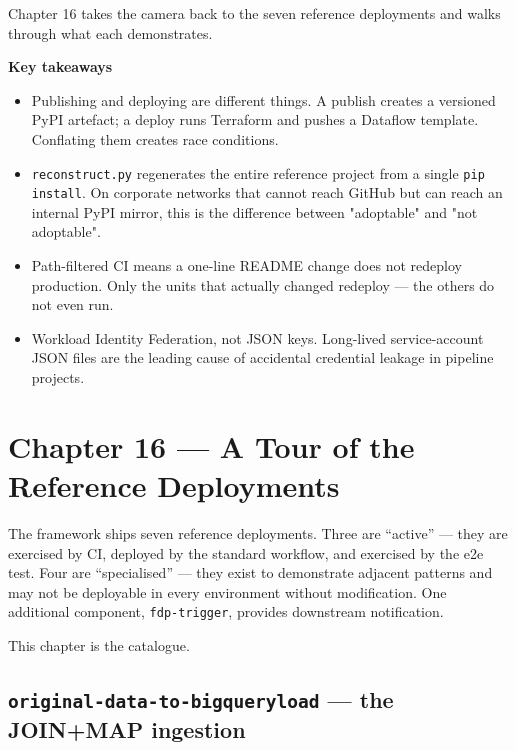 \documentclass[
  11pt,
  british,
  oneside]{book}
\begin{document}
Chapter 16 takes the camera back to the seven reference deployments and
walks through what each demonstrates.

\begin{takeaways}
\textbf{Key takeaways}
\begin{itemize}
  \item Publishing and deploying are different things. A publish creates a versioned PyPI artefact; a deploy runs Terraform and pushes a Dataflow template. Conflating them creates race conditions.
  \item \texttt{reconstruct.py} regenerates the entire reference project from a single \texttt{pip install}. On corporate networks that cannot reach GitHub but can reach an internal PyPI mirror, this is the difference between "adoptable" and "not adoptable".
  \item Path-filtered CI means a one-line README change does not redeploy production. Only the units that actually changed redeploy — the others do not even run.
  \item Workload Identity Federation, not JSON keys. Long-lived service-account JSON files are the leading cause of accidental credential leakage in pipeline projects.
\end{itemize}
\end{takeaways}

\newpage

\hypertarget{chapter-16-a-tour-of-the-reference-deployments}{%
\chapter{Chapter 16 --- A Tour of the Reference
Deployments}\label{chapter-16-a-tour-of-the-reference-deployments}}

The framework ships seven reference deployments. Three are ``active''
--- they are exercised by CI, deployed by the standard workflow, and
exercised by the e2e test. Four are ``specialised'' --- they exist to
demonstrate adjacent patterns and may not be deployable in every
environment without modification. One additional component,
\texttt{fdp-trigger}, provides downstream notification.

This chapter is the catalogue.

\hypertarget{original-data-to-bigqueryload-the-joinmap-ingestion}{%
\section{\texorpdfstring{\texttt{original-data-to-bigqueryload} --- the
JOIN+MAP
ingestion}{original-data-to-bigqueryload --- the JOIN+MAP ingestion}}\label{original-data-to-bigqueryload-the-joinmap-ingestion}}
\end{document}
